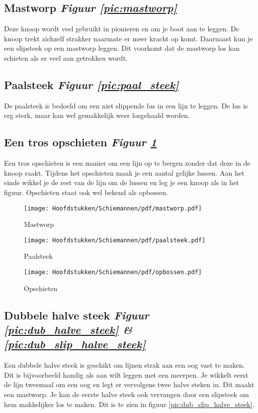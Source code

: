 \subsection{Mastworp \hfill \textit{Figuur \ref{pic:mastworp}}}
Deze knoop wordt veel gebruikt in pionieren en om je boot aan te leggen. De knoop trekt zichzelf strakker naarmate er meer kracht op komt. Daarnaast kun je een slipsteek op een mastworp leggen. Dit voorkomt dat de mastworp los kan schieten als er veel aan getrokken wordt.
\subsection{Paalsteek \hfill \textit{Figuur \ref{pic:paal_steek}}} 
De paalsteek is bedoeld om een niet slippende lus in een lijn te leggen. De lus is erg sterk, maar kan wel gemakkelijk weer losgehaald worden.
\subsection{Een tros opschieten \hfill \textit{Figuur \ref{pic:opschieten}}}
Een tros opschieten is een manier om een lijn op te bergen zonder dat deze in de knoop raakt. Tijdens het opschieten maak je een aantal gelijke lussen. Aan het einde wikkel je de rest van de lijn om de lussen en leg je een knoop als in het figuur. Opschieten staat ook wel bekend als opbossen.
\begin{figure}[h]
  \centering
  \begin{minipage}[b]{0.32\textwidth}
  \centering
    \texttt{[image: Hoofdstukken/Schiemannen/pdf/mastworp.pdf]}
    \caption{Mastworp}
    \label{pic:mastworp}
  \end{minipage}
  \hfill
  \begin{minipage}[b]{0.32\textwidth}
    \centering
    \texttt{[image: Hoofdstukken/Schiemannen/pdf/paalsteek.pdf]}
    \caption{Paalsteek}
    \label{pic:paal_steek}
    \end{minipage}
  \hfill
   \begin{minipage}[b]{0.32\textwidth}
    \centering
    \texttt{[image: Hoofdstukken/Schiemannen/pdf/opbossen.pdf]}
    \caption{Opschieten}
    \label{pic:opschieten}
    \end{minipage}
\end{figure}


\subsection{Dubbele halve steek \hfill \textit{Figuur \ref{pic:dub_halve_steek} \& \ref{pic:dub_slip_halve_steek}}}
Een dubbele halve steek is geschikt om lijnen strak aan een oog vast te maken. Dit is bijvoorbeeld handig als aan wilt leggen met een meerpen. Je wikkelt eerst de lijn tweemaal om een oog en legt er vervolgens twee halve steken in. Dit maakt een mastworp. Je kan de eerste halve steek ook vervangen door een slipsteek om hem makkelijker los te maken. Dit is te zien in figuur \ref{pic:dub_slip_halve_steek}.


